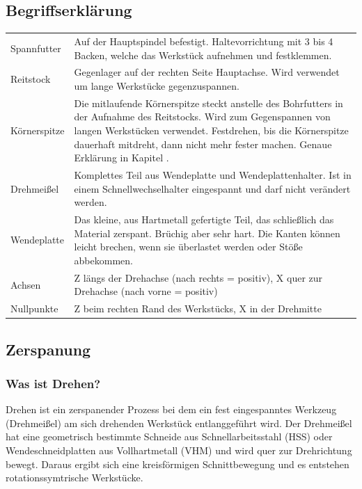 \documentclass{\basedir/fablab-document}
\begin{document}
\subsection{Begriffserklärung}
\begin{tabular}{p{} p{}}
Spannfutter 	& Auf der Hauptspindel befestigt. Haltevorrichtung mit 3 bis 4 Backen, welche das Werkstück aufnehmen und festklemmen. \\
Reitstock 		& Gegenlager auf der rechten Seite Hauptachse. Wird verwendet um lange Werkstücke gegenzuspannen. \\
Körnerspitze 	& Die mitlaufende Körnerspitze steckt anstelle des Bohrfutters in der Aufnahme des Reitstocks. Wird zum Gegenspannen von langen Werkstücken verwendet. Festdrehen, bis die Körnerspitze dauerhaft mitdreht, dann nicht mehr fester machen. Genaue Erklärung in Kapitel \todo{}. \\
Drehmeißel 		& Komplettes Teil aus Wendeplatte und Wendeplattenhalter. Ist in einem Schnellwechselhalter eingespannt und darf nicht verändert werden. \\
Wendeplatte 	& Das kleine, aus Hartmetall gefertigte Teil, das schließlich das Material zerspant. Brüchig aber sehr hart. Die Kanten können leicht brechen, wenn sie überlastet werden oder Stöße abbekommen. \\
Achsen 				& Z längs der Drehachse (nach rechts = positiv), X quer zur Drehachse (nach vorne = positiv) \\
Nullpunkte 		& Z beim rechten Rand des Werkstücks, X in der Drehmitte \\
\end{tabular}

\subsection{Zerspanung}
\subsubsection{Was ist Drehen?}
Drehen ist ein zerspanender Prozess bei dem ein fest eingespanntes Werkzeug (Drehmeißel) am sich drehenden Werkstück entlanggeführt wird.
Der Drehmeißel hat eine geometrisch bestimmte Schneide aus Schnellarbeitsstahl (HSS) oder Wendeschneidplatten aus Vollhartmetall (VHM) und wird quer zur Drehrichtung bewegt.
Daraus ergibt sich eine kreisförmigen Schnittbewegung und es entstehen rotationssymtrische Werkstücke.
\end{document}
